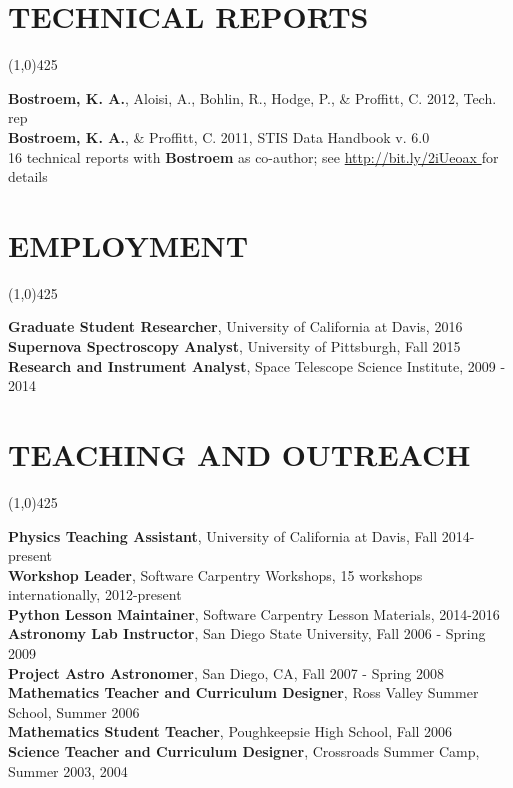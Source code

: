 \documentclass{res}
\begin{document}
\begin{resume}
\section{TECHNICAL REPORTS}
\vspace{-.2in} 
\begin{center}
\line(1,0){425}
\end{center}
\vspace{-.25in} 
\vspace{0.1in}
{\bf Bostroem, K. A.}, Aloisi, A., Bohlin, R., Hodge, P., \& Proffitt, C. 2012, Tech. rep \\
{\bf Bostroem, K. A.}, \& Proffitt, C. 2011, STIS Data Handbook v. 6.0\\
16 technical reports with {\bf Bostroem} as co-author; see \color{blue}\url{http://bit.ly/2iUeoax }\color{black}\hspace*{0pt} for details
\section{EMPLOYMENT}
\vspace{-.2in} 
\begin{center}
\line(1,0){425}
\end{center}
\vspace{-.3in} 
\vspace{0.1in} 
    {\bf Graduate Student Researcher}, University of California at Davis, 2016 \\
    {\bf Supernova Spectroscopy Analyst}, University of Pittsburgh, Fall 2015 \\
    {\bf Research and Instrument Analyst}, Space Telescope Science Institute, 2009 - 2014 
%
\section{TEACHING AND OUTREACH}
\vspace{-.2in} 
\begin{center}
\line(1,0){425}
\end{center}
\vspace{-.24in} 
\vspace{0.1in}
   {\bf Physics Teaching Assistant}, University of California at Davis, Fall 2014-present \\
   {\bf  Workshop Leader}, Software Carpentry Workshops, 15 workshops internationally, 2012-present \\	
   {\bf Python Lesson Maintainer}, Software Carpentry Lesson Materials, 2014-2016\\
   {\bf  Astronomy Lab Instructor}, San Diego State University, Fall 2006 - Spring 2009  \\
   {\bf Project Astro Astronomer}, San Diego, CA, Fall 2007 - Spring 2008 \\
   {\bf Mathematics Teacher and Curriculum Designer}, Ross Valley Summer School, Summer 2006 \\
   {\bf Mathematics Student Teacher}, Poughkeepsie High School,  Fall 2006 \\
   {\bf Science Teacher and Curriculum Designer}, Crossroads Summer Camp, Summer 2003, 2004 \\
\end{resume}
\end{document}
